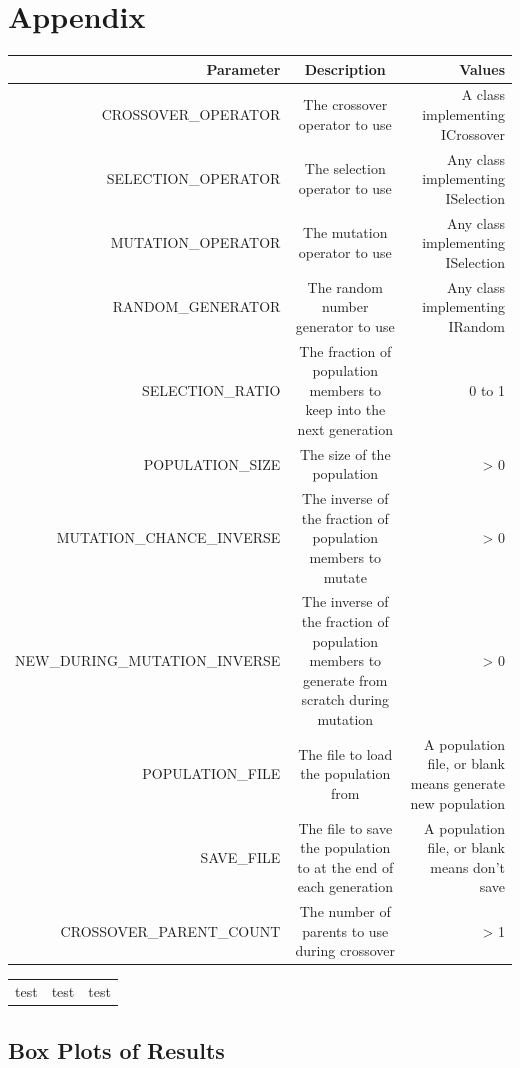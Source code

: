 \documentclass[]{report}
\begin{document}
\chapter{Appendix}
\begin{landscape}
\begin{tabular}{r | c | r}
Parameter & Description & Values \\
\hline
CROSSOVER\_OPERATOR & The crossover operator to use & A class implementing ICrossover \\
SELECTION\_OPERATOR & The selection operator to use & Any class implementing ISelection \\
MUTATION\_OPERATOR & The mutation operator to use & Any class implementing ISelection \\
RANDOM\_GENERATOR & The random number generator to use & Any class implementing IRandom \\
SELECTION\_RATIO & The fraction of population members to keep into the next generation & 0 to 1 \\
POPULATION\_SIZE & The size of the population & > 0 \\
MUTATION\_CHANCE\_INVERSE & The inverse of the fraction of population members to mutate & > 0 \\
NEW\_DURING\_MUTATION\_INVERSE & The inverse of the fraction of population members to generate from scratch during mutation & > 0 \\
POPULATION\_FILE & The file to load the population from & A population file, or blank means generate new population \\
SAVE\_FILE & The file to save the population to at the end of each generation & A population file, or blank means don't save \\
CROSSOVER\_PARENT\_COUNT & The number of parents to use during crossover & > 1 \\ 
\end{tabular}      
\end{landscape}  

\cite{brambillaBook}
\begin{longtable}{l | l | l}
\hline
test & test & test
\end{longtable}




\section{Box Plots of Results}
\end{document}
